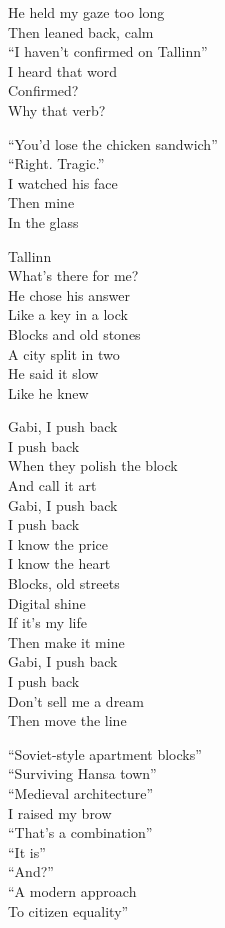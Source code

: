 \begin{lyrics}
He held my gaze too long\\
Then leaned back, calm\\
“I haven’t confirmed on Tallinn”\\
I heard that word\\
Confirmed?\\
Why that verb?

“You’d lose the chicken sandwich”\\
“Right. Tragic.”\\
I watched his face\\
Then mine\\
In the glass

Tallinn\\
What’s there for me?\\
He chose his answer\\
Like a key in a lock\\
Blocks and old stones\\
A city split in two\\
He said it slow\\
Like he knew

Gabi, I push back\\
I push back\\
When they polish the block\\
And call it art\\
Gabi, I push back\\
I push back\\
I know the price\\
I know the heart\\
Blocks, old streets\\
Digital shine\\
If it’s my life\\
Then make it mine\\
Gabi, I push back\\
I push back\\
Don’t sell me a dream\\
Then move the line

“Soviet-style apartment blocks”\\
“Surviving Hansa town”\\
“Medieval architecture”\\
I raised my brow\\
“That’s a combination”\\
“It is”\\
“And?”\\
“A modern approach\\
To citizen equality”


\end{lyrics}
